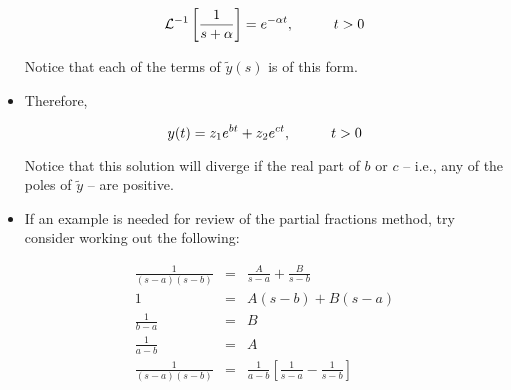 \documentclass{article}
\newcommand{\Lapl}{\mathcal{L}}
\begin{document}
\begin{itemize}
\[ \Lapl^{-1} \left[ \frac{1}{s + \alpha} \right] = e^{-\alpha t}, \hspace{1 cm} t > 0 \]

Notice that each of the terms of $\tilde{y}(s)$ is of this form.

\item Therefore,

\[ y(t) = z_1e^{bt} + z_2 e^{ct}, \hspace{1 cm} t > 0 \]

Notice that this solution will diverge if the real part of $b$ or $c$ -- i.e., any of the poles of $\tilde{y}$ -- are positive.

\item If an example is needed for review of the partial fractions method, try consider working out the following:

\begin{eqnarray*}
\frac{1}{(s-a)(s-b)} & = & \frac{A}{s-a} + \frac{B}{s-b}\\
1 & = & A \left( s-b \right) + B \left( s - a \right)\\
\frac{1}{b - a} &= & B\\
\frac{1}{a-b} & = & A\\
\frac{1}{(s-a)(s-b)} & = & \frac{1}{a-b} \left[\frac{1}{s-a} - \frac{1}{s-b} \right]
\end{eqnarray*}

\end{itemize}
\end{document}
